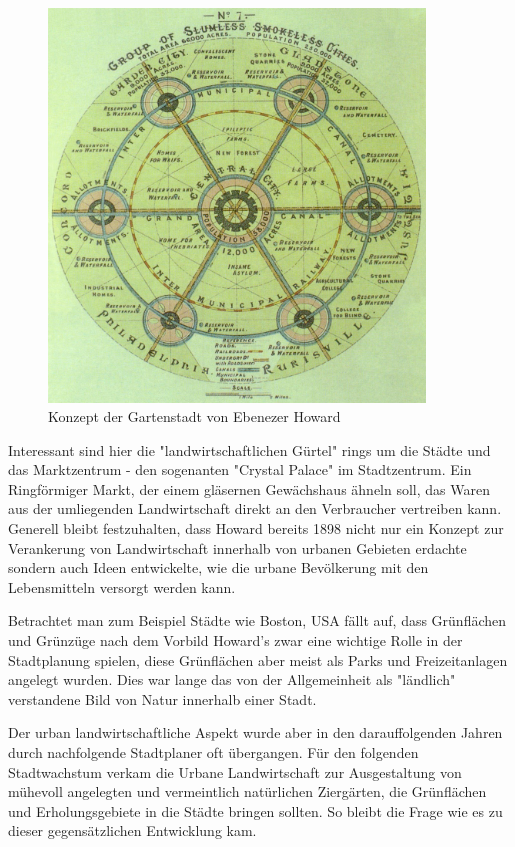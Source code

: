 \documentclass{scrartcl}
\begin{document}
\begin{figure}[htp]
\centering
\includegraphics[width=10cm]{image_folder/GardenCityConcept_EbenezerHoward.jpg}
\caption{Konzept der Gartenstadt von Ebenezer Howard}
\label{fig:GardenCityConcept_EbenezerHoward}
\end{figure}

Interessant sind hier die "landwirtschaftlichen Gürtel" rings um die Städte und das Marktzentrum - den sogenanten "Crystal Palace" im Stadtzentrum.
Ein Ringförmiger Markt, der einem gläsernen Gewächshaus ähneln soll, das Waren aus der umliegenden Landwirtschaft direkt an den Verbraucher vertreiben kann. Generell bleibt festzuhalten, dass Howard bereits 1898 nicht nur ein Konzept zur Verankerung von Landwirtschaft innerhalb von urbanen Gebieten erdachte sondern auch Ideen entwickelte, wie die urbane Bevölkerung mit den Lebensmitteln versorgt werden kann.

Betrachtet man zum Beispiel Städte wie Boston, USA fällt auf, dass Grünflächen und Grünzüge nach dem Vorbild Howard's zwar eine wichtige Rolle in der Stadtplanung spielen, diese Grünflächen aber meist als Parks und Freizeitanlagen angelegt wurden. Dies war lange das von der Allgemeinheit als "ländlich" verstandene Bild von Natur innerhalb einer Stadt.

Der urban landwirtschaftliche Aspekt wurde aber in den darauffolgenden Jahren durch nachfolgende Stadtplaner oft übergangen. Für den folgenden Stadtwachstum verkam die Urbane Landwirtschaft zur Ausgestaltung von mühevoll angelegten und vermeintlich natürlichen Ziergärten, die Grünflächen und Erholungsgebiete in die Städte bringen sollten. So bleibt die Frage wie es zu dieser gegensätzlichen Entwicklung kam.
\end{document}
